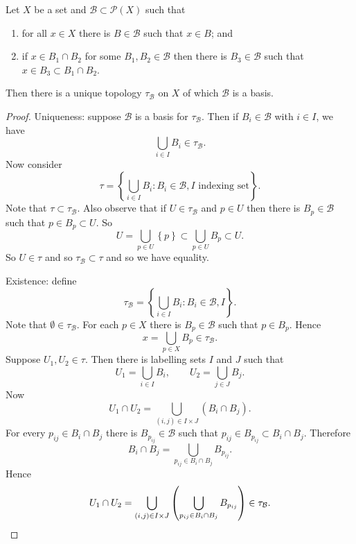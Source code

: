 
\begin{theorem}[]
	Let $X$ be a set and $\mathcal B \subset \mathcal P(X)$
	such that
	\begin{enumerate}
		\item for all $x \in X$
			there is $B \in \mathcal B$
			such that $x \in B$; and

		\item if $x \in B_1 \cap B_2$ for some
			$B_1, B_2 \in \mathcal B$ then
			there is $B_3 \in \mathcal B$
			such that $x \in B_3 \subset B_1 \cap B_2$.
	\end{enumerate}
	Then there is a unique topology $\tau_{\mathcal B}$
	on $X$ of which $\mathcal B$ is a basis.
\end{theorem}

\begin{proof}
	Uniqueness:
	suppose $\mathcal B$ is a basis for $\tau_{\mathcal B}$.
	Then if $B_i \in \mathcal B$ with $i \in I$, we have
	\[
		\bigcup_{i\in I} B_i \in \tau_{\mathcal B}.
	\]
	Now consider
	\[
		\tau = \left\{
			\bigcup_{i \in I} B_i:
			B_i \in \mathcal B, \text{$I$ indexing set}
		\right\}.
	\]
	Note that $\tau \subset \tau_{\mathcal B}$.
	Also observe that if $U \in \tau_{\mathcal B}$ and $p \in U$ then
	there is $B_p \in \mathcal B$ such that
	$p \in B_p \subset U$.
	So
	\[
		U = \bigcup_{p \in U} \left\{ p \right\}
		\subset \bigcup_{p \in U} B_p \subset U.
	\]
	So $U \in \tau$ and so $\tau_{\mathcal B} \subset \tau$
	and so we have equality.

	Existence: define
	\[
		\tau_{\mathcal B} =
		\left\{
			\bigcup_{i \in I} B_i :
			B_i \in \mathcal B, I
		\right\}.
	\]
	Note that $\emptyset \in \tau_{\mathcal B}$.
	For each $p \in X$ there is $B_p \in \mathcal B$ such that
	$p \in B_p$.
	Hence
	\[
		x = \bigcup_{p \in X} B_p \in \tau_{\mathcal B}.
	\]
	Suppose $U_1, U_2 \in \tau$.
	Then there is labelling sets $I$ and $J$ such that
	\[
		U_1 = \bigcup_{i \in I} B_i, \qquad
		U_2 = \bigcup_{j \in J} B_j.
	\]
	Now
	\[
		U_1 \cap U_2 =
		\bigcup_{(i,j) \in I \times J} \left( B_i \cap B_j \right).
	\]
	For every $p_{ij} \in B_i \cap B_j$ there is $B_{p_{ij}} \in \mathcal B$
	such that $p_{ij} \in B_{p_{ij}} \subset B_i \cap B_j$.
	Therefore
	\[
		B_i \cap B_j = \bigcup_{p_{ij} \in B_i \cap B_j} B_{p_{ij}}.
	\]
	Hence
	\[
		U_1 \cap U_2 =
		\bigcup_{(i,j) \in I \times J}
		\left( 
			\bigcup_{p_{ij} \in B_i \cap B_j} B_{p_{ij}}
		\right)
		\in \tau_{\mathcal B}.\qedhere
	\]
\end{proof}

